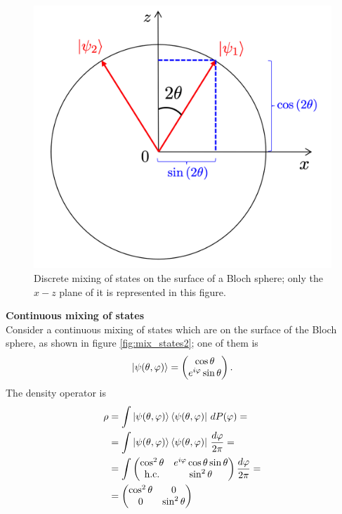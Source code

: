 \begin{figure}[H]
\centering
\includegraphics[width=0.48\linewidth]{images/Mixing_states_1.png}
    \caption{Discrete mixing of states on the surface of a Bloch sphere; only the $x-z$ plane of it is represented in this figure.}
    \label{fig:mix_states1}
\end{figure}

\begin{tcolorbox} 
\textbf{Continuous mixing of states} \\
Consider a continuous mixing of states which are on the surface of the Bloch sphere, as shown in figure \ref{fig:mix_states2}; one of them is
\begin{align*}
    \ket{\psi(\theta,\varphi)} = \begin{pmatrix} \cos{\theta} \\ e^{i \varphi} \sin{\theta} \end{pmatrix}. 
\end{align*}
The density operator is 
\begin{align*}
    \rho &= \int \ket{\psi(\theta,\varphi)} \bra{\psi(\theta,\varphi)} \, dP(\varphi) = \\
    &= \int \ket{\psi(\theta,\varphi)} \bra{\psi(\theta,\varphi)} \, \frac{d \varphi}{2 \pi} = \\
    &= \int \begin{pmatrix} \cos^2{\theta} & e^{i \varphi} \cos{\theta} \sin{\theta} \\ \text{h.c.} & \sin^2{\theta} \end{pmatrix} \frac{d \varphi}{2 \pi} = \\
    &= \begin{pmatrix} \cos^2{\theta} & 0 \\ 0 & \sin^2{\theta} \end{pmatrix} 
\end{align*}
\end{tcolorbox}

